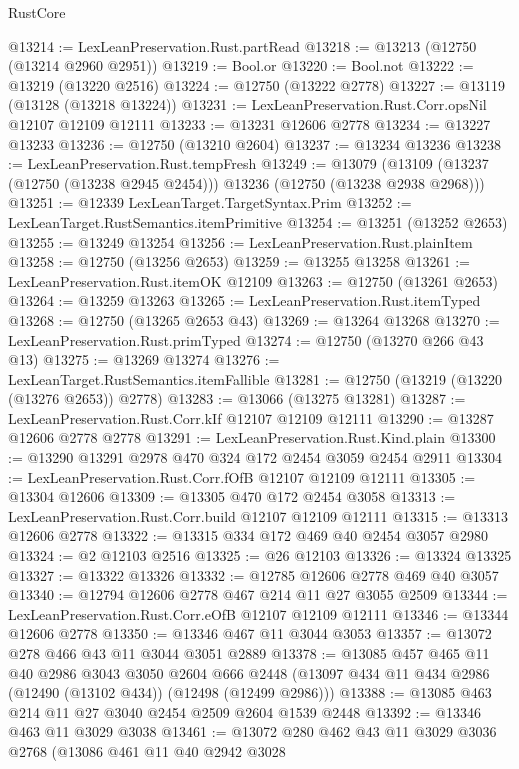 \begin{lexlean}{RustCore}
\begin{coremodule}
@13214 := LexLeanPreservation.Rust.partRead
@13218 := @13213 (@12750 (@13214 @2960 @2951))
@13219 := Bool.or
@13220 := Bool.not
@13222 := @13219 (@13220 @2516)
@13224 := @12750 (@13222 @2778)
@13227 := @13119 (@13128 (@13218 @13224))
@13231 := LexLeanPreservation.Rust.Corr.opsNil @12107 @12109 @12111
@13233 := @13231 @12606 @2778
@13234 := @13227 @13233
@13236 := @12750 (@13210 @2604)
@13237 := @13234 @13236
@13238 := LexLeanPreservation.Rust.tempFresh
@13249 := @13079
    (@13109 (@13237 (@12750 (@13238 @2945 @2454))) @13236 (@12750 (@13238 @2938 @2968)))
@13251 := @12339 LexLeanTarget.TargetSyntax.Prim
@13252 := LexLeanTarget.RustSemantics.itemPrimitive
@13254 := @13251 (@13252 @2653)
@13255 := @13249 @13254
@13256 := LexLeanPreservation.Rust.plainItem
@13258 := @12750 (@13256 @2653)
@13259 := @13255 @13258
@13261 := LexLeanPreservation.Rust.itemOK @12109
@13263 := @12750 (@13261 @2653)
@13264 := @13259 @13263
@13265 := LexLeanPreservation.Rust.itemTyped
@13268 := @12750 (@13265 @2653 @43)
@13269 := @13264 @13268
@13270 := LexLeanPreservation.Rust.primTyped
@13274 := @12750 (@13270 @266 @43 @13)
@13275 := @13269 @13274
@13276 := LexLeanTarget.RustSemantics.itemFallible
@13281 := @12750 (@13219 (@13220 (@13276 @2653)) @2778)
@13283 := @13066 (@13275 @13281)
@13287 := LexLeanPreservation.Rust.Corr.kIf @12107 @12109 @12111
@13290 := @13287 @12606 @2778 @2778
@13291 := LexLeanPreservation.Rust.Kind.plain
@13300 := @13290 @13291 @2978 @470 @324 @172 @2454 @3059 @2454 @2911
@13304 := LexLeanPreservation.Rust.Corr.fOfB @12107 @12109 @12111
@13305 := @13304 @12606
@13309 := @13305 @470 @172 @2454 @3058
@13313 := LexLeanPreservation.Rust.Corr.build @12107 @12109 @12111
@13315 := @13313 @12606 @2778
@13322 := @13315 @334 @172 @469 @40 @2454 @3057 @2980
@13324 := @2 @12103 @2516
@13325 := @26 @12103
@13326 := @13324 @13325
@13327 := @13322 @13326
@13332 := @12785 @12606 @2778 @469 @40 @3057
@13340 := @12794 @12606 @2778 @467 @214 @11 @27 @3055 @2509
@13344 := LexLeanPreservation.Rust.Corr.eOfB @12107 @12109 @12111
@13346 := @13344 @12606 @2778
@13350 := @13346 @467 @11 @3044 @3053
@13357 := @13072 @278 @466 @43 @11 @3044 @3051 @2889
@13378 := @13085
    @457
    @465
    @11
    @40
    @2986
    @3043
    @3050
    @2604
    @666
    @2448
    (@13097 @434 @11 @434 @2986 (@12490 (@13102 @434)) (@12498 (@12499 @2986)))
@13388 := @13085 @463 @214 @11 @27 @3040 @2454 @2509 @2604 @1539 @2448
@13392 := @13346 @463 @11 @3029 @3038
@13461 := @13072
    @280
    @462
    @43
    @11
    @3029
    @3036
    @2768
    (@13086
      @461
      @11
      @40
      @2942
      @3028

\end{coremodule}
\end{lexlean}
